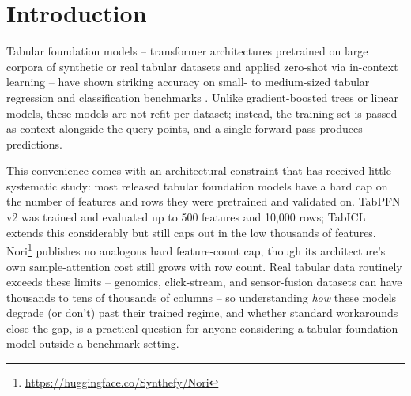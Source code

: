 \documentclass{article}
\begin{document}
\begin{abstract}
largest $D$, matched by a plain cross-validated Ridge baseline at 0.157), Nori falls
to 0.098, and TabPFN -- the model whose native regime the feature-bagging ensemble was
originally proposed to extend -- falls furthest of all six models tested, to 0.035,
below Random Forest (0.061) and XGBoost (0.082). Dimensionality alone is not the
hazard; dimensionality that carries proportionally more true signal than a fixed
training set can support is, and different foundation model architectures degrade at
very different rates once it does. TabPFN's default model version is gated behind an
interactive, human-completed license acceptance, but we found its original v2
weights are available ungated directly from Hugging Face, which let us obtain full
automated results for all three foundation models; we describe this workaround so
others facing the same blocker do not need to rediscover it.
\end{abstract}

\section{Introduction}
\label{sec:intro}

Tabular foundation models -- transformer architectures pretrained on large corpora of
synthetic or real tabular datasets and applied zero-shot via in-context learning --
have shown striking accuracy on small- to medium-sized tabular regression and
classification benchmarks \citep{muller2022transformers, hollmann2025tabpfn}. Unlike
gradient-boosted trees or linear models, these models are not refit per dataset;
instead, the training set is passed as context alongside the query points, and a
single forward pass produces predictions.

This convenience comes with an architectural constraint that has received little
systematic study: most released tabular foundation models have a hard cap on the
number of features and rows they were pretrained and validated on. TabPFN v2
\citep{hollmann2025tabpfn} was trained and evaluated up to 500 features and 10,000
rows; TabICL \citep{qu2025tabicl} extends this considerably but still caps out in the
low thousands of features. Nori\footnote{\url{https://huggingface.co/Synthefy/Nori}}
publishes no analogous hard feature-count cap, though its architecture's own
sample-attention cost still grows with row count. Real tabular data routinely exceeds
these limits --
genomics, click-stream, and sensor-fusion datasets can have thousands to tens of
thousands of columns -- so understanding \emph{how} these models degrade (or don't)
past their trained regime, and whether standard workarounds close the gap, is a
practical question for anyone considering a tabular foundation model outside a
benchmark setting.
\end{document}
